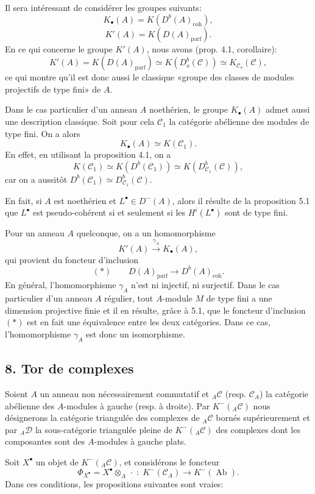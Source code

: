 \documentclass[11pt]{article}
\providecommand{\parf}{\mathrm{parf}}
\providecommand{\coh}{\mathrm{coh}}
\providecommand{\cC}{\mathcal C}
\providecommand{\Ab}{\operatorname{Ab}}
\providecommand{\cC}{\mathcal C}
\providecommand{\cD}{\mathcal D}
\providecommand{\Ab}{\operatorname{Ab}}
\providecommand{\parf}{\mathrm{parf}}
\providecommand{\coh}{\mathrm{coh}}
\begin{document}
Il sera intéressant de considérer les groupes suivants:
\[
K_\bullet(A)=K(D^b(A)_{\coh}),
\]
\[
K'(A)=K(D(A)_{\parf}).
\]
En ce qui concerne le groupe $K'(A)$, nous avons (prop. 4.1, corollaire):
\[
K'(A)=K(D(A)_{\parf})\simeq K(D_o^b(\cC))\simeq K_{\cC_o}(\cC),
\]
ce qui montre qu'il est donc aussi le classique «groupe des classes de modules projectifs de type fini» de $A$.

Dans le cas particulier d'un anneau $A$ noethérien, le groupe $K_\bullet(A)$ admet aussi une description classique. Soit pour cela $\cC_1$ la catégorie abélienne des modules de type fini. On a alors
\[
K_\bullet(A)\simeq K(\cC_1).
\]
En effet, en utilisant la proposition 4.1, on a
\[
K(\cC_1)\simeq K(D^b(\cC_1))\simeq K(D^b_{\cC_1}(\cC)),
\]
car on a aussitôt $D^b(\cC_1)\simeq D^b_{\cC_1}(\cC)$.

En fait, si $A$ est noethérien et $L^\bullet\in D^-(A)$, alors il résulte de la proposition 5.1 que $L^\bullet$ est pseudo-cohérent si et seulement si les $H^i(L^\bullet)$ sont de type fini.

Pour un anneau $A$ quelconque, on a un homomorphisme
\[
K'(A)\xrightarrow{\gamma_A}K_\bullet(A),
\]
qui provient du foncteur d'inclusion
\[
(*)\qquad D(A)_{\parf}\longrightarrow D^b(A)_{\coh}.
\]
En général, l'homomorphisme $\gamma_A$ n'est ni injectif, ni surjectif. Dans le cas particulier d'un anneau $A$ régulier, tout $A$-module $M$ de type fini a une dimension projective finie et il en résulte, grâce à 5.1, que le foncteur d'inclusion $(*)$ est en fait une équivalence entre les deux catégories. Dans ce cas, l'homomorphisme $\gamma_A$ est donc un isomorphisme.

\subsection*{8. Tor de complexes}

Soient $A$ un anneau non nécessairement commutatif et ${}_A\cC$ (resp. $\cC_A$) la catégorie abélienne des $A$-modules à gauche (resp. à droite). Par $K^-({}_A\cC)$ nous désignerons la catégorie triangulée des complexes de ${}_A\cC$ bornés supérieurement et par ${}_A\cD$ la sous-catégorie triangulée pleine de $K^-({}_A\cC)$ des complexes dont les composantes sont des $A$-modules à gauche plats.

Soit $X^\bullet$ un objet de $K^-({}_A\cC)$, et considérons le foncteur
\[
\Phi_{X^\bullet}=X^\bullet\otimes_A\,\cdot\;:\;K^-(\cC_A)\longrightarrow K^-(\Ab).
\]
Dans ces conditions, les propositions suivantes sont vraies:
\end{document}
